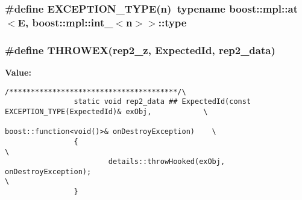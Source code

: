 \subsubsection{\setlength{\rightskip}{0pt plus 5cm}\#define EXCEPTION\_\-TYPE(n)~typename boost::mpl::at$<$E, boost::mpl::int\_\-$<$n$>$$>$::type}\label{_exception_expecter_8h_749b107121d935e89f9d07b857c40878}


\subsubsection{\setlength{\rightskip}{0pt plus 5cm}\#define THROWEX(rep2\_\-z, Expected\-Id, rep2\_\-data)}\label{_exception_expecter_8h_e7e72ff604e8a4d5c04024b5f9068893}


\textbf{Value:}

\begin{Code}\begin{verbatim}/***************************************/\
                static void rep2_data ## ExpectedId(const EXCEPTION_TYPE(ExpectedId)& exObj,            \
                                                                                        boost::function<void()>& onDestroyException)    \
                {                                                                                                                                                                       \
                        details::throwHooked(exObj, onDestroyException);                                                                \
                }
\end{verbatim}\end{Code}
